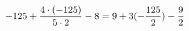 \documentclass[preview]{standalone}
\begin{document}
\begin{align*}
\special{dvisvgm:raw <g id='unique000'>}-125 + \frac{4 \cdot (-125)}{5 \cdot 2} - 8 = 9 + 3(- \frac{125}{2}) - \frac{9}{2}\special{dvisvgm:raw </g>}
\end{align*}
\end{document}
